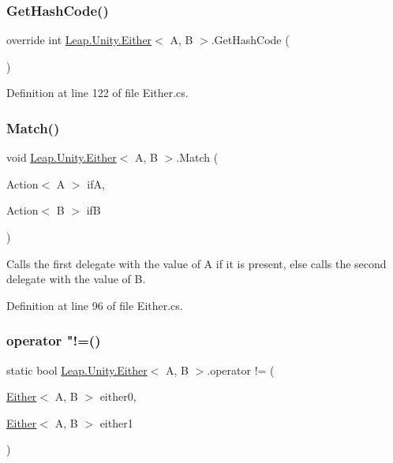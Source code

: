\subsubsection{\texorpdfstring{GetHashCode()}{GetHashCode()}}
{\footnotesize\ttfamily override int \mbox{\hyperlink{struct_leap_1_1_unity_1_1_either}{Leap.\+Unity.\+Either}}$<$ A, B $>$.Get\+Hash\+Code (\begin{DoxyParamCaption}{ }\end{DoxyParamCaption})}



Definition at line 122 of file Either.\+cs.

\mbox{\label{struct_leap_1_1_unity_1_1_either_a4c0eaf284c03842b99f53ec3f059faac}} 
\subsubsection{\texorpdfstring{Match()}{Match()}}
{\footnotesize\ttfamily void \mbox{\hyperlink{struct_leap_1_1_unity_1_1_either}{Leap.\+Unity.\+Either}}$<$ A, B $>$.Match (\begin{DoxyParamCaption}\item[{Action$<$ A $>$}]{ifA,  }\item[{Action$<$ B $>$}]{ifB }\end{DoxyParamCaption})}



Calls the first delegate with the value of A if it is present, else calls the second delegate with the value of B. 



Definition at line 96 of file Either.\+cs.

\mbox{\label{struct_leap_1_1_unity_1_1_either_ac30ec0b03336fd8a86a119c60889cebf}} 
\subsubsection{\texorpdfstring{operator "!=()}{operator !=()}}
{\footnotesize\ttfamily static bool \mbox{\hyperlink{struct_leap_1_1_unity_1_1_either}{Leap.\+Unity.\+Either}}$<$ A, B $>$.operator != (\begin{DoxyParamCaption}\item[{\mbox{\hyperlink{struct_leap_1_1_unity_1_1_either}{Either}}$<$ A, B $>$}]{either0,  }\item[{\mbox{\hyperlink{struct_leap_1_1_unity_1_1_either}{Either}}$<$ A, B $>$}]{either1 }\end{DoxyParamCaption})\hspace{0.3cm}{\ttfamily [static]}}



